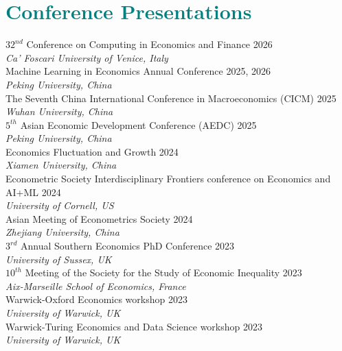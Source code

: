 \documentclass[A4,11pt]{article}
\begin{document}


\section{\textbf{\Large{\textcolor{teal}{Conference Presentations}}}}
\smallskip\smallskip

$32^{nd}$ Conference on Computing in Economics and Finance \hfill{2026} \\
\textit{Ca' Foscari University of Venice, Italy}\\
\smallskip
Machine Learning in Economics Annual Conference \hfill{2025, 2026} \\
\textit{Peking University, China}\\
\smallskip
The Seventh China International Conference in Macroeconomics (CICM) \hfill{2025} \\
\textit{Wuhan University, China}\\
\smallskip
$5^{th}$ Asian Economic Development Conference (AEDC) \hfill{2025} \\
\textit{Peking University, China}\\
\smallskip
Economics Fluctuation and Growth \hfill{2024} \\
\textit{Xiamen University, China}\\
\smallskip
Econometric Society Interdisciplinary Frontiers conference on Economics and AI+ML \hfill{2024} \\
\textit{University of Cornell, US}\\
\smallskip
Asian Meeting of Econometrics Society \hfill{2024} \\
\textit{Zhejiang University, China}\\
\smallskip
$3^{rd}$ Annual Southern Economics PhD Conference \hfill{2023} \\
\textit{University of Sussex, UK}\\
\smallskip
$10^{th}$ Meeting of the Society for the Study of Economic Inequality \hfill{2023} \\
\textit{Aix-Marseille School of Economics, France}\\
\smallskip
Warwick-Oxford Economics workshop \hfill{2023} \\
\textit{University of Warwick, UK}\\
\smallskip
Warwick-Turing Economics and Data Science workshop \hfill{2023} \\
\textit{University of Warwick, UK}
\end{document}
